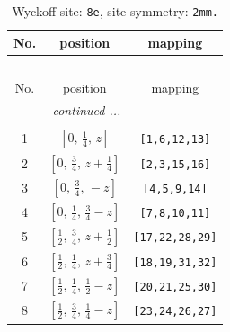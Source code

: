 \documentclass[fleqn,8pt]{jsarticle}
\begin{document}
\begin{longtable}{ccc}
\caption{Wyckoff site: {\tt 8e}, site symmetry: {\tt 2mm.}}
 \\
 \hline \hline
No. & position & mapping \\ \hline \endfirsthead

\multicolumn{2}{l}{\tablename\ \thetable{}} \\
 \hline \hline
No. & position & mapping \\ \hline \endhead

 \hline \hline
\multicolumn{2}{r}{\footnotesize\it continued ...} \\ \endfoot

 \hline \hline
\multicolumn{2}{r}{} \\ \endlastfoot

1 & $\left[ 0,\, \frac{1}{4},\, z \right]$ & {\tt [1,6,12,13]} \\ \hline
2 & $\left[ 0,\, \frac{3}{4},\, z + \frac{1}{4} \right]$ & {\tt [2,3,15,16]} \\ \hline
3 & $\left[ 0,\, \frac{3}{4},\, - z \right]$ & {\tt [4,5,9,14]} \\ \hline
4 & $\left[ 0,\, \frac{1}{4},\, \frac{3}{4} - z \right]$ & {\tt [7,8,10,11]} \\ \hline
5 & $\left[ \frac{1}{2},\, \frac{3}{4},\, z + \frac{1}{2} \right]$ & {\tt [17,22,28,29]} \\ \hline
6 & $\left[ \frac{1}{2},\, \frac{1}{4},\, z + \frac{3}{4} \right]$ & {\tt [18,19,31,32]} \\ \hline
7 & $\left[ \frac{1}{2},\, \frac{1}{4},\, \frac{1}{2} - z \right]$ & {\tt [20,21,25,30]} \\ \hline
8 & $\left[ \frac{1}{2},\, \frac{3}{4},\, \frac{1}{4} - z \right]$ & {\tt [23,24,26,27]} \\
\end{longtable}
\renewcommand{\arraystretch}{1.2}
\end{document}
